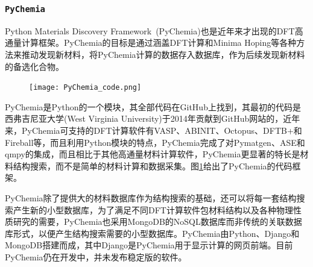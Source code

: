 \frame
{
\frametitle{\tt{PyChemia}}
\textrm{Python Materials Discovery Framework~(PyChemia)}也是近年来才出现的\textrm{DFT}高通量计算框架。\textrm{PyChemia}的目标是通过涵盖\textrm{DFT}计算和\textrm{Minima Hoping}等各种方法来推动发现新材料，将\textrm{PyChemia}计算的数据存入数据库，作为后续发现新材料的备选化合物。

\begin{figure}[h!]
\centering
\vspace*{-0.1in}
\texttt{[image: PyChemia\_code.png]}
\caption{\fontsize{7.2pt}{4.2pt}}%
\label{PyChemia_FireWork}
\end{figure} 
\textrm{PyChemia}是\textrm{Python}的一个模块，其全部代码在\textrm{GitHub}上找到\cite{PyChemia_Github}，其最初的代码是西弗吉尼亚大学\textrm{(West Virginia University)}于2014年贡献到\textrm{GitHub}网站的，近年来，\textrm{PyChemia}可支持的\textrm{DFT}计算软件有\textrm{VASP}、\textrm{ABINIT}、\textrm{Octopus}、\textrm{DFTB+}和\textrm{Fireball}等，而且利用Python模块的特点，\textrm{PyChemia}完成了对\textrm{Pymatgen}、\textrm{ASE}和\textrm{qmpy}的集成，而且相比于其他高通量材料计算软件，\textrm{PyChemia}更显著的特长是材料结构搜索，而不是简单的材料计算和数据采集。图\ref{PyChemia_FireWork}给出了\textrm{PyChemia}的代码框架。

\textrm{PyChemia}除了提供大的材料数据库作为结构搜索的基础，还可以将每一套结构搜索产生新的小型数据库，为了满足不同\textrm{DFT}计算软件包材料结构以及各种物理性质研究的需要，\textrm{PyChemia}也采用\textrm{MongoDB}的\textrm{NoSQL}数据库而非传统的关联数据库形式，以便产生结构搜索需要的小型数据库。\textrm{PyChemia}由\textrm{Python}、\textrm{Django}和\textrm{MongoDB}搭建而成，其中\textrm{Django}是\textrm{PyChemia}用于显示计算的网页前端。目前\textrm{PyChemia}仍在开发中，并未发布稳定版的软件。
}

